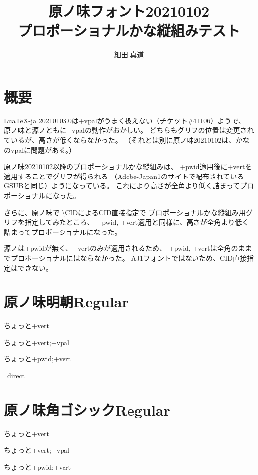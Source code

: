 \documentclass[tate,paper={297mm,210mm}]{jlreq}
\title{原ノ味フォント20210102 \\ プロポーショナルかな縦組みテスト}
\author{細田 真道}
\begin{document}
\maketitle

\section*{概要}

LuaTeX-ja 20210103.0は+vpalがうまく扱えない（チケット\#41106）ようで、
原ノ味と源ノともに+vpalの動作がおかしい。
どちらもグリフの位置は変更されているが、高さが低くならなかった。
（それとは別に原ノ味20210102は、かなのvpalに問題がある。）

原ノ味20210102以降のプロポーショナルかな縦組みは、
+pwid適用後に+vertを適用することでグリフが得られる
（Adobe-Japan1のサイトで配布されているGSUBと同じ）ようになっている。
これにより高さが全角より低く詰まってプロポーショナルになった。

さらに、原ノ味で \textbackslash CIDによるCID直接指定で
プロポーショナルかな縦組み用グリフを指定してみたところ、
+pwid, +vert適用と同様に、高さが全角より低く詰まってプロポーショナルになった。

源ノは+pwidが無く、+vertのみが適用されるため、
+pwid, +vertは全角のままでプロポーショナルにはならなかった。
AJ1フォントではないため、CID直接指定はできない。

\clearpage

\section*{原ノ味明朝Regular}

\hmrnone\hbox{\tate\vrule ちょっと\vrule +vert}

\hmrvpal\hbox{\tate\vrule ちょっと\vrule +vert;+vpal}

\hmrpwidvert\hbox{\tate\vrule ちょっと\vrule +pwid;+vert}

\hmrnone\hbox{\tate\vrule%
  \vrule direct}

\section*{原ノ味角ゴシックRegular}

\hgrnone\hbox{\tate\vrule ちょっと\vrule +vert}

\hgrvpal\hbox{\tate\vrule ちょっと\vrule +vert;+vpal}

\hgrpwidvert\hbox{\tate\vrule ちょっと\vrule +pwid;+vert}
\end{document}
